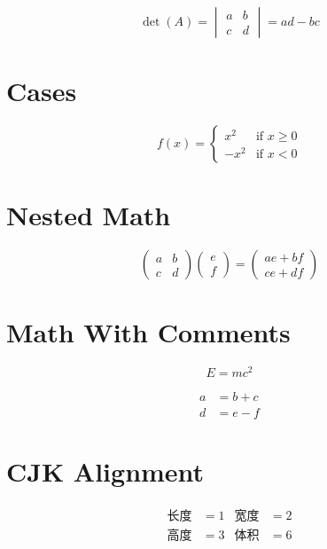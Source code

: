 \documentclass{article}
\begin{document}
\begin{equation}
\det(A) = \begin{vmatrix}
a & b \\
c & d
\end{vmatrix} = ad - bc
\end{equation}

\section{Cases}
\begin{equation}
f(x) = \begin{cases}
x^2   & \text{if } x \geq 0 \\
-x^2  & \text{if } x < 0
\end{cases}
\end{equation}

\section{Nested Math}
\begin{equation}
\begin{pmatrix}
a & b \\
c & d
\end{pmatrix}
\begin{pmatrix}
e \\
f
\end{pmatrix}
=
\begin{pmatrix}
ae + bf \\
ce + df
\end{pmatrix}
\end{equation}

\section{Math With Comments}
\begin{equation}
E = mc^2 %
\end{equation}

\begin{align}
a &= b + c \\ %
d &= e - f %
\end{align}

\section{CJK Alignment}
\begin{align}
长度 & = 1 & 宽度 & = 2 \\
高度 & = 3 & 体积 & = 6
\end{align}
\end{document}
